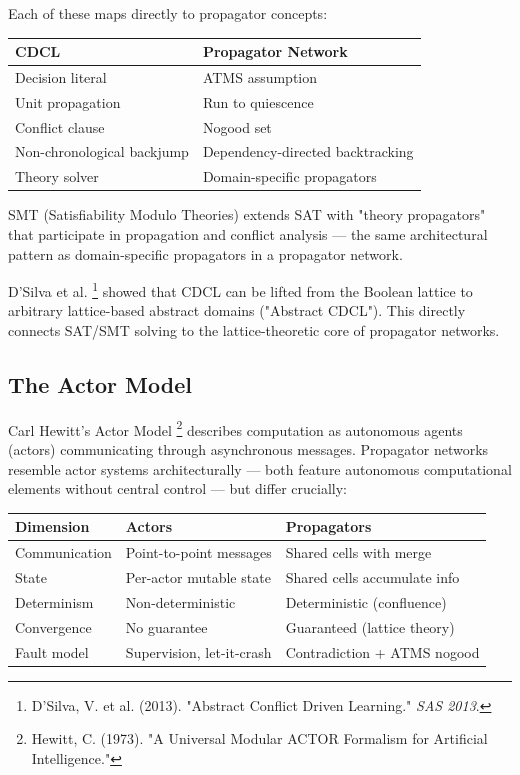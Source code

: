 \documentclass[11pt]{article}
\begin{document}
Each of these maps directly to propagator concepts:

\begin{center}
\begin{tabular}{ll}
CDCL & Propagator Network\\
\hline
Decision literal & ATMS assumption\\
Unit propagation & Run to quiescence\\
Conflict clause & Nogood set\\
Non-chronological backjump & Dependency-directed backtracking\\
Theory solver & Domain-specific propagators\\
\end{tabular}
\end{center}

SMT (Satisfiability Modulo Theories) extends SAT with "theory
propagators" that participate in propagation and conflict analysis ---
the same architectural pattern as domain-specific propagators in a
propagator network.

D'Silva et al. \footnote{D'Silva, V. et al. (2013). "Abstract Conflict Driven
Learning." \emph{SAS 2013}.\label{org393d4e3}} showed that CDCL can be lifted from the
Boolean lattice to arbitrary lattice-based abstract domains ("Abstract
CDCL"). This directly connects SAT/SMT solving to the lattice-theoretic
core of propagator networks.
\subsection{The Actor Model}
\label{sec:orgbac87a9}

Carl Hewitt's Actor Model \footnote{Hewitt, C. (1973). "A Universal Modular ACTOR Formalism
for Artificial Intelligence."} describes computation as
autonomous agents (actors) communicating through asynchronous messages.
Propagator networks resemble actor systems architecturally --- both
feature autonomous computational elements without central control ---
but differ crucially:

\begin{center}
\begin{tabular}{lll}
Dimension & Actors & Propagators\\
\hline
Communication & Point-to-point messages & Shared cells with merge\\
State & Per-actor mutable state & Shared cells accumulate info\\
Determinism & Non-deterministic & Deterministic (confluence)\\
Convergence & No guarantee & Guaranteed (lattice theory)\\
Fault model & Supervision, let-it-crash & Contradiction + ATMS nogood\\
\end{tabular}
\end{center}
\end{document}

